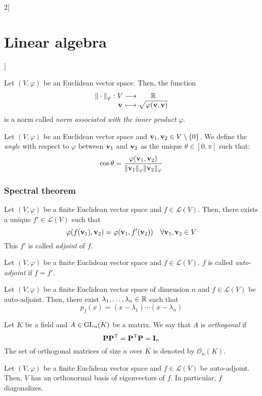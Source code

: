 \documentclass[../../../main_math.tex]{subfiles}
\begin{document}
\begin{multicols}{2}[\section{Linear algebra}]
  \begin{proposition}
    Let $(V,\varphi)$ be an Euclidean vector space. Then, the function
    $$\function{\|\cdot\|_\varphi}{V}{\RR}{\vf{v}}{\sqrt{\varphi(\vf{v},\vf{v})}}$$
    is a norm called \emph{norm associated with the inner product} $\varphi$.
  \end{proposition}
  \begin{definition}
    Let $(V,\varphi)$ be an Euclidean vector space and $\boldsymbol{\mathrm{v}}_1,\boldsymbol{\mathrm{v}}_2\in V\setminus\{0\}$. We define the \emph{angle} with respect to $\varphi$ between $\boldsymbol{\mathrm{v}}_1$ and $\boldsymbol{\mathrm{v}}_2$ as the unique $\theta\in[0,\pi]$ such that: $$\cos{\theta}=\frac{\varphi(\boldsymbol{\mathrm{v}}_1,\boldsymbol{\mathrm{v}}_2)}{\|\boldsymbol{\mathrm{v}}_1\|_\varphi\|\boldsymbol{\mathrm{v}}_2\|_\varphi}$$
  \end{definition}
  \subsubsection{Spectral theorem}
  \begin{definition}
    Let $(V,\varphi)$ be a finite Euclidean vector space and $f\in\mathcal{L}(V)$. Then, there exists a unique $f'\in\mathcal{L}(V)$ such that $$\varphi(f(\boldsymbol{\mathrm{v}}_1),\boldsymbol{\mathrm{v}}_2)=\varphi(\boldsymbol{\mathrm{v}}_1,f'(\boldsymbol{\mathrm{v}}_2))\quad\forall \boldsymbol{\mathrm{v}}_1,\boldsymbol{\mathrm{v}}_2\in V$$ This $f'$ is called \emph{adjoint} of $f$.
  \end{definition}
  \begin{definition}
    Let $(V,\varphi)$ be a finite Euclidean vector space and $f\in\mathcal{L}(V)$. $f$ is called \emph{auto-adjoint} if $f=f'$.
  \end{definition}
  \begin{lemma}
    Let $(V,\varphi)$ be a finite Euclidean vector space of dimension $n$ and $f\in\mathcal{L}(V)$ be auto-adjoint. Then, there exist $\lambda_1,\ldots,\lambda_n\in\mathbb{R}$ such that $$p_f(x)=(x-\lambda_1 )\cdots(x-\lambda_n)$$
  \end{lemma}
  \begin{definition}
    Let $K$ be a field and $A\in\mathrm{GL}_n(K)$ be a matrix. We say that $A$ is \emph{orthogonal} if $$\boldsymbol{\mathrm{P}}{\boldsymbol{\mathrm{P}}}^{\mathrm{T}}={\boldsymbol{\mathrm{P}}}^{\mathrm{T}}\boldsymbol{\mathrm{P}}=\boldsymbol{\mathrm{I}}_n$$ The set of orthogonal matrices of size $n$ over $K$ is denoted by $\mathcal{O}_n(K)$.
  \end{definition}
  \begin{theorem}
    Let $(V,\varphi)$ be a finite Euclidean vector space and $f\in\mathcal{L}(V)$ be auto-adjoint. Then, $V$ has an orthonormal basis of eigenvectors of $f$. In particular, $f$ diagonalizes.

\end{theorem}
\end{multicols}
\end{document}
